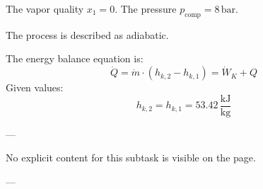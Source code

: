 The vapor quality \( x_1 = 0 \).  
The pressure \( p_{\text{comp}} = 8 \, \text{bar} \).  

The process is described as adiabatic.  

The energy balance equation is:  
\[
\dot{Q} = \dot{m} \cdot (h_{k,2} - h_{k,1}) = \dot{W}_K + Q
\]  
Given values:  
\[
h_{k,2} = h_{k,1} = 53.42 \, \frac{\text{kJ}}{\text{kg}}
\]  

---

No explicit content for this subtask is visible on the page.  

---